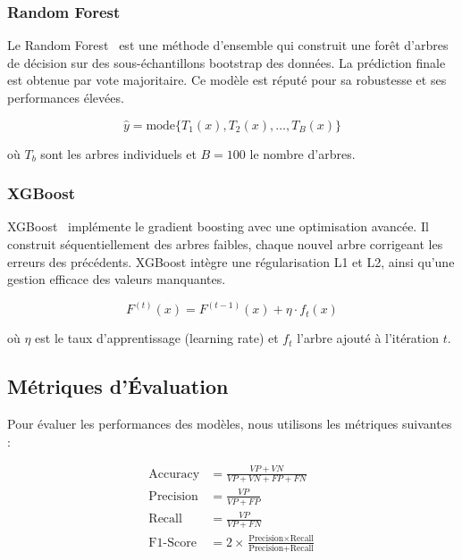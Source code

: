 \documentclass[12pt,a4paper]{article}
\begin{document}
\subsubsection{Random Forest}

Le Random Forest~\cite{breiman2001} est une méthode d'ensemble qui construit une forêt d'arbres de décision sur des sous-échantillons bootstrap des données. La prédiction finale est obtenue par vote majoritaire. Ce modèle est réputé pour sa robustesse et ses performances élevées.

\begin{equation}
    \hat{y} = \text{mode}\{T_1(x), T_2(x), \ldots, T_B(x)\}
\end{equation}

où $T_b$ sont les arbres individuels et $B=100$ le nombre d'arbres.

\subsubsection{XGBoost}

XGBoost~\cite{chen2016} implémente le gradient boosting avec une optimisation avancée. Il construit séquentiellement des arbres faibles, chaque nouvel arbre corrigeant les erreurs des précédents. XGBoost intègre une régularisation L1 et L2, ainsi qu'une gestion efficace des valeurs manquantes.

\begin{equation}
    F^{(t)}(x) = F^{(t-1)}(x) + \eta \cdot f_t(x)
\end{equation}

où $\eta$ est le taux d'apprentissage (learning rate) et $f_t$ l'arbre ajouté à l'itération $t$.

\subsection{Métriques d'Évaluation}

Pour évaluer les performances des modèles, nous utilisons les métriques suivantes :

\begin{align}
    \text{Accuracy} &= \frac{VP + VN}{VP + VN + FP + FN} \\
    \text{Precision} &= \frac{VP}{VP + FP} \\
    \text{Recall} &= \frac{VP}{VP + FN} \\
    \text{F1-Score} &= 2 \times \frac{\text{Precision} \times \text{Recall}}{\text{Precision} + \text{Recall}}
\end{align}
\end{document}
